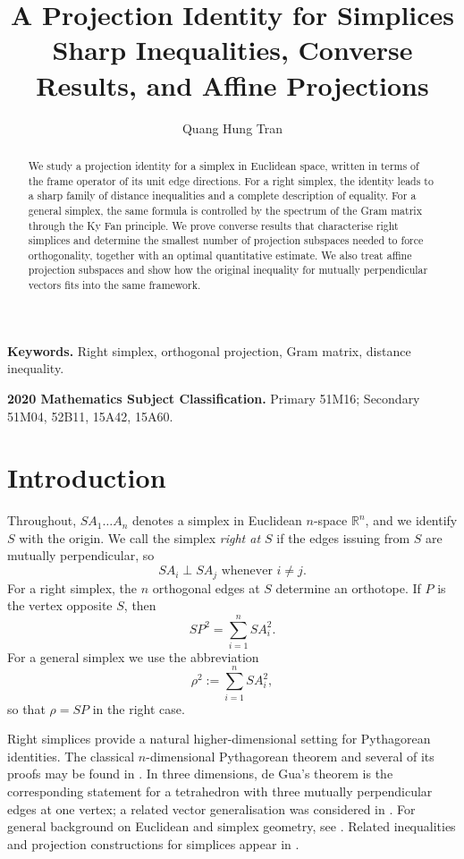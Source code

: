 \documentclass[11pt]{article}
\title{A Projection Identity for Simplices\\
Sharp Inequalities, Converse Results, and Affine Projections}
\author{Quang Hung Tran}
\date{}
\theoremstyle{definition}
\theoremstyle{remark}
\newcommand{\R}{\mathbb{R}}
\begin{document}
\maketitle

\begin{abstract}
We study a projection identity for a simplex in Euclidean space, written in terms of the frame operator of its unit edge directions. For a right simplex, the identity leads to a sharp family of distance inequalities and a complete description of equality. For a general simplex, the same formula is controlled by the spectrum of the Gram matrix through the Ky Fan principle. We prove converse results that characterise right simplices and determine the smallest number of projection subspaces needed to force orthogonality, together with an optimal quantitative estimate. We also treat affine projection subspaces and show how the original inequality for mutually perpendicular vectors fits into the same framework.
\end{abstract}

\noindent
\textbf{Keywords.} Right simplex, orthogonal projection, Gram matrix, distance inequality.

\medskip
\noindent
\textbf{2020 Mathematics Subject Classification.}
Primary 51M16; Secondary 51M04, 52B11, 15A42, 15A60.

\section{Introduction}\label{sec:intro}

Throughout, $SA_1\ldots A_n$ denotes a simplex in Euclidean $n$-space $\R^n$, and we
identify $S$ with the origin. We call the simplex \emph{right at $S$} if the edges issuing
from $S$ are mutually perpendicular, so
\[
SA_i\perp SA_j \text{ whenever } i\ne j.
\]
For a right simplex, the $n$ orthogonal edges at $S$ determine an orthotope. If $P$ is the
vertex opposite $S$, then
\[
SP^2=\sum_{i=1}^{n}SA_i^2.
\]
For a general simplex we use the abbreviation
\[
\rho^2:=\sum_{i=1}^{n}SA_i^2,
\]
so that $\rho=SP$ in the right case.

Right simplices provide a natural higher-dimensional setting for Pythagorean identities.
The classical $n$-dimensional Pythagorean theorem and several of its proofs may be found in
\cite{DonchianCoxeter,ConantBeyer,LinLin,Porter,EiflerRhee,Cook,Drucker,TranPythagoras}.
In three dimensions, de Gua's theorem is the corresponding statement for a tetrahedron with
three mutually perpendicular edges at one vertex; a related vector generalisation was
considered in \cite{TranDeGua}. For general background on Euclidean and simplex geometry,
see \cite{Berger,Coxeter,Fiedler}. Related inequalities and projection constructions for
simplices appear in \cite{TranKlamkin,TranVanAubel,TranGrace}.
\end{document}
